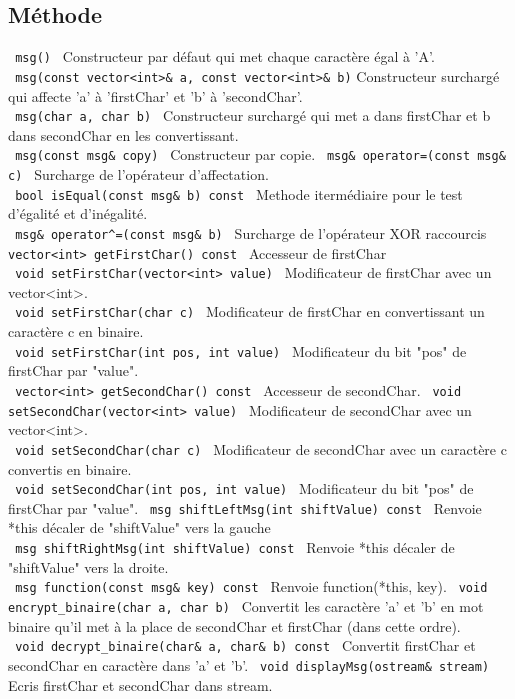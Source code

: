 \documentclass[10pt,a4paper]{article}
\begin{document}
\subsection*{Méthode}
\verb| msg() | Constructeur par défaut qui met chaque caractère égal à 'A'.\\
\verb| msg(const vector<int>& a, const vector<int>& b)| Constructeur surchargé qui affecte 'a' à 'firstChar' et 'b' à 'secondChar'.\\
\verb| msg(char a, char b) | Constructeur surchargé qui met a dans firstChar et b dans secondChar en les convertissant.\\
\verb| msg(const msg& copy) | Constructeur par copie.
\newline
\newline
\verb| msg& operator=(const msg& c) | Surcharge de l'opérateur d'affectation.\\
\verb| bool isEqual(const msg& b) const | Methode itermédiaire pour le test d'égalité et d'inégalité.\\
\verb| msg& operator^=(const msg& b) | Surcharge de l'opérateur XOR raccourcis
\newline
\newline
\verb| vector<int> getFirstChar() const | Accesseur de firstChar\\
\verb| void setFirstChar(vector<int> value) | Modificateur de firstChar avec un vector<int>.\\
\verb| void setFirstChar(char c) | Modificateur de firstChar en convertissant un caractère c en binaire.\\
\verb| void setFirstChar(int pos, int value) | Modificateur du bit "pos" de firstChar par "value".\\
\verb| vector<int> getSecondChar() const | Accesseur de secondChar.
\verb| void setSecondChar(vector<int> value) | Modificateur de secondChar avec un vector<int>.\\
\verb| void setSecondChar(char c) | Modificateur de secondChar avec un caractère c convertis en binaire.\\
\verb| void setSecondChar(int pos, int value) | Modificateur du bit "pos" de firstChar par "value".
\newline
\newline
\verb| msg shiftLeftMsg(int shiftValue) const | Renvoie *this décaler de "shiftValue" vers la gauche\\
\verb| msg shiftRightMsg(int shiftValue) const | Renvoie *this décaler de "shiftValue" vers la droite.\\
\verb| msg function(const msg& key) const | Renvoie function(*this, key).
\newline
\newline
\verb| void encrypt_binaire(char a, char b) | Convertit les caractère 'a' et 'b' en mot binaire qu'il met à la place de secondChar et firstChar (dans cette ordre).\\
\verb| void decrypt_binaire(char& a, char& b) const | Convertit firstChar et secondChar en caractère dans 'a' et 'b'.
\newline
\newline
\verb| void displayMsg(ostream& stream) | Ecris firstChar et secondChar dans stream.
\end{document}
